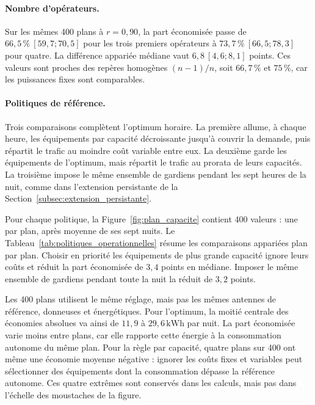 \paragraph{Nombre d'opérateurs.}
Sur les mêmes 400 plans à \(r=0{,}90\), la part économisée passe de
\(66{,}5\,\%\ [59{,}7;70{,}5]\) pour les trois premiers opérateurs à
\(73{,}7\,\%\ [66{,}5;78{,}3]\) pour quatre. La différence appariée médiane
vaut \(6{,}8\ [4{,}6;8{,}1]\) points. Ces valeurs sont proches des
repères homogènes \((n-1)/n\), soit \(66{,}7\,\%\) et \(75\,\%\), car les
puissances fixes sont comparables.

\paragraph{Politiques de référence.}
Trois comparaisons complètent l'optimum horaire. La première allume, à chaque
heure, les équipements par capacité décroissante jusqu'à couvrir la demande,
puis répartit le trafic au moindre coût variable entre eux. La deuxième garde
les équipements de l'optimum, mais répartit le trafic au prorata de leurs
capacités. La troisième impose le même ensemble de gardiens pendant les sept
heures de la nuit, comme dans l'extension persistante de la
Section~\ref{subsec:extension_persistante}.

Pour chaque politique, la Figure~\ref{fig:plan_capacite} contient 400
valeurs : une par plan, après moyenne de ses sept nuits. Le
Tableau~\ref{tab:politiques_operationnelles} résume les comparaisons
appariées plan par plan. Choisir en priorité les équipements de plus grande
capacité ignore leurs coûts et réduit la part économisée de \(3{,}4\) points
en médiane. Imposer le même ensemble de gardiens pendant toute la nuit la
réduit de \(3{,}2\) points.

Les 400 plans utilisent le même réglage, mais pas les mêmes antennes de
référence, donneuses et énergétiques. Pour l'optimum, la moitié centrale des
économies absolues va ainsi de \(11{,}9\) à \(29{,}6\,\mathrm{kWh}\) par nuit.
La part économisée varie moins entre plans, car elle rapporte cette énergie à
la consommation autonome du même plan. Pour la règle par capacité, quatre
plans sur 400 ont même une économie moyenne négative : ignorer les coûts fixes
et variables peut sélectionner des équipements dont la consommation dépasse
la référence autonome. Ces quatre extrêmes sont conservés dans les calculs,
mais pas dans l'échelle des moustaches de la figure.

